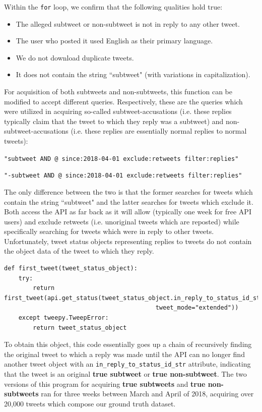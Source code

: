 \documentclass[11pt, twoside, reqno]{book}
\begin{document}
\noindent
Within the \verb|for| loop, we confirm that the following qualities hold true:
\begin{itemize}
	\item The alleged subtweet or non-subtweet is not in reply to any other tweet.
	\item The user who posted it used English as their primary language.
	\item We do not download duplicate tweets.
	\item It does not contain the string ``subtweet" (with variations in capitalization).
\end{itemize}
\noindent
For acquisition of both subtweets and non-subtweets, this function can be modified to accept different queries. Respectively, these are the queries which were utilized in acquiring so-called subtweet-accusations (i.e. these replies typically claim that the tweet to which they reply was a subtweet) and non-subtweet-accusations (i.e. these replies are essentially normal replies to normal tweets):

\verb|"subtweet AND @ since:2018-04-01 exclude:retweets filter:replies"|

\verb|"-subtweet AND @ since:2018-04-01 exclude:retweets filter:replies"|

\noindent
The only difference between the two is that the former searches for tweets which contain the string ``subtweet" and the latter searches for tweets which exclude it. Both access the API as far back as it will allow (typically one week for free API users) and exclude retweets (i.e. unoriginal tweets which are reposted) while specifically searching for tweets which were in reply to other tweets. Unfortunately, tweet status objects representing replies to tweets do not contain the object data of the tweet to which they reply.

\begin{verbatim}
def first_tweet(tweet_status_object):
    try:
        return first_tweet(api.get_status(tweet_status_object.in_reply_to_status_id_str,
                                          tweet_mode="extended"))
    except tweepy.TweepError:
        return tweet_status_object
\end{verbatim}

\noindent
To obtain this object, this code essentially goes up a chain of recursively finding the original tweet to which a reply was made until the API can no longer find another tweet object with an \verb|in_reply_to_status_id_str| attribute, indicating that the tweet is an original \textbf{true subtweet} or \textbf{true non-subtweet}. The two versions of this program for acquiring \textbf{true subtweets} and \textbf{true non-subtweets} ran for three weeks between March and April of 2018, acquiring over 20,000 tweets which compose our ground truth dataset.
\end{document}
